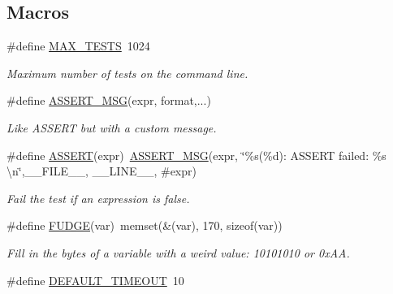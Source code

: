 \subsection*{Macros}
\begin{DoxyCompactItemize}
\item 
\hypertarget{group__Testing_ga2a77d2f2c5b698c69c19e1f8782bf709}{\#define \hyperlink{group__Testing_ga2a77d2f2c5b698c69c19e1f8782bf709}{M\-A\-X\-\_\-\-T\-E\-S\-T\-S}~1024}\label{group__Testing_ga2a77d2f2c5b698c69c19e1f8782bf709}

\begin{DoxyCompactList}\small\item\em Maximum number of tests on the command line. \end{DoxyCompactList}\item 
\#define \hyperlink{group__Testing_ga9be407f8744aff436633d34c62591cb9}{A\-S\-S\-E\-R\-T\-\_\-\-M\-S\-G}(expr, format,...)
\begin{DoxyCompactList}\small\item\em Like A\-S\-S\-E\-R\-T but with a custom message. \end{DoxyCompactList}\item 
\#define \hyperlink{group__Testing_ga28301f76c53b643912da7c538f74e2c6}{A\-S\-S\-E\-R\-T}(expr)~\hyperlink{group__Testing_ga9be407f8744aff436633d34c62591cb9}{A\-S\-S\-E\-R\-T\-\_\-\-M\-S\-G}(expr, \char`\"{}\%s(\%d)\-: A\-S\-S\-E\-R\-T failed\-: \%s \textbackslash{}n\char`\"{},\-\_\-\-\_\-\-F\-I\-L\-E\-\_\-\-\_\-, \-\_\-\-\_\-\-L\-I\-N\-E\-\_\-\-\_\-, \#expr)
\begin{DoxyCompactList}\small\item\em Fail the test if an expression is false. \end{DoxyCompactList}\item 
\hypertarget{group__Testing_ga1ac76218e138d4f495b9a695c5da5b9b}{\#define \hyperlink{group__Testing_ga1ac76218e138d4f495b9a695c5da5b9b}{F\-U\-D\-G\-E}(var)~memset(\&(var), 170, sizeof(var))}\label{group__Testing_ga1ac76218e138d4f495b9a695c5da5b9b}

\begin{DoxyCompactList}\small\item\em Fill in the bytes of a variable with a weird value\-: 10101010 or 0x\-A\-A. \end{DoxyCompactList}\item 
\hypertarget{group__Testing_gaad2dd72565852b91c809cd4685833b17}{\#define \hyperlink{group__Testing_gaad2dd72565852b91c809cd4685833b17}{D\-E\-F\-A\-U\-L\-T\-\_\-\-T\-I\-M\-E\-O\-U\-T}~10}\label{group__Testing_gaad2dd72565852b91c809cd4685833b17}


\end{DoxyCompactItemize}
